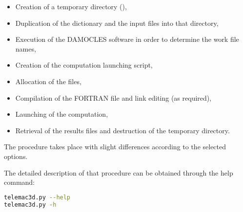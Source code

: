\begin{itemize}
\item Creation of a temporary directory
(),

\item Duplication of the dictionary and the input files into that directory,

\item Execution of the DAMOCLES software in order to determine the work file names,

\item Creation of the computation launching script,

\item Allocation of the files,

\item Compilation of the FORTRAN file and link editing (as required),

\item Launching of the computation,

\item Retrieval of the results files and destruction of the temporary directory.
\end{itemize}

The procedure takes place with slight differences according to the selected
options.

The detailed description of that procedure can be obtained through the help
command:

\begin{lstlisting}[language=bash]
telemac3d.py --help
telemac3d.py -h
\end{lstlisting}
